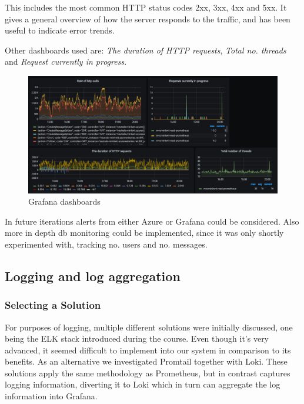 \documentclass{article}
\begin{document}
This includes the most common HTTP status codes 2xx, 3xx, 4xx and 5xx. It gives a general overview of how the server responds to the traffic, and has been useful to indicate error trends.

Other dashboards used are: \textit{The duration of HTTP requests}, \textit{Total no. threads} and \textit{Request currently in progress}. 


\begin{figure}[H]
\centering
\includegraphics[width=1\textwidth]{images/dashboard.png}
\caption{\label{fig:dashboard} Grafana dashboards}
\end{figure}

In future iterations alerts from either Azure or Grafana could be considered. Also more in depth db monitoring could be implemented, since it was only shortly experimented with, tracking no. users and no. messages.

\subsection{Logging and log aggregation}
\subsubsection{Selecting a Solution}
For purposes of logging, multiple different solutions were initially discussed, one being the ELK stack introduced during the course. Even though it's very advanced, it seemed difficult to implement into our system in comparison to its benefits. 
As an alternative we investigated Promtail together with Loki. These solutions apply the same methodology as Prometheus, but in contrast captures logging information, diverting it to Loki which in turn can aggregate the log information into Grafana.
\end{document}
